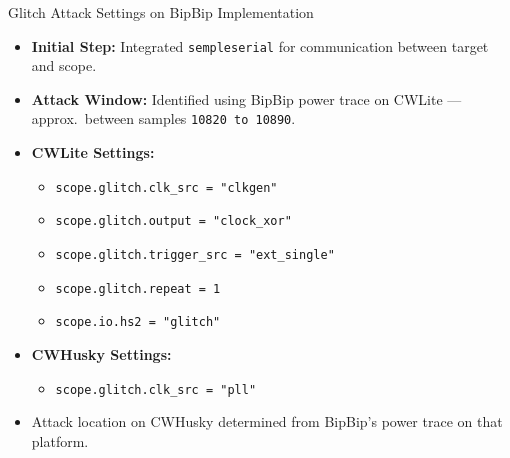 \documentclass{beamer}
\newenvironment{tres important}[2][]{
	\setkeys{EmphEqEnv}{#2}
	\setkeys{EmphEqOpt}{box={\setlength{\fboxsep}{10pt}\fcolorbox{myNewColorA}{white}},#1}
	\EmphEqMainEnv}
{\endEmphEqMainEnv}
\begin{document}
\begin{frame}[fragile]{Glitch Attack Settings on BipBip Implementation}
\begin{itemize}
    \item \textbf{Initial Step:} Integrated \texttt{sempleserial} for communication between target and scope.
    \item \textbf{Attack Window:} Identified using BipBip power trace on CWLite — approx.\ between samples \texttt{10820 to 10890}.
    \item \textbf{CWLite Settings:}
    \begin{itemize}
        \item \texttt{scope.glitch.clk_src = "clkgen"}
        \item \texttt{scope.glitch.output = "clock_xor"}
        \item \texttt{scope.glitch.trigger_src = "ext_single"}
        \item \texttt{scope.glitch.repeat = 1}
        \item \texttt{scope.io.hs2 = "glitch"}
    \end{itemize}
    \item \textbf{CWHusky Settings:}
    \begin{itemize}
        \item \texttt{scope.glitch.clk_src = "pll"}
    \end{itemize}
    \item Attack location on CWHusky determined from BipBip's power trace on that platform.
\end{itemize}
\end{frame}
\end{document}
